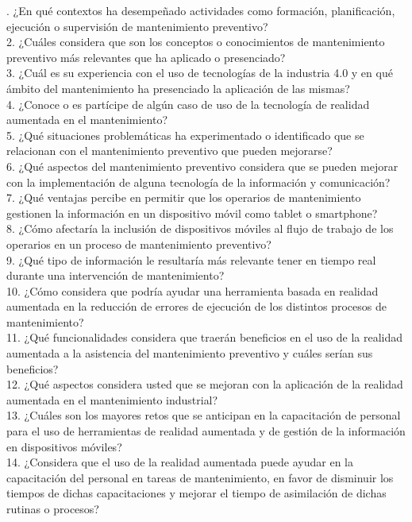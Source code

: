 {. ¿En qué contextos ha desempeñado actividades como formación, planificación, ejecución o supervisión de mantenimiento preventivo?\\

    2. ¿Cuáles considera que son los conceptos o conocimientos de mantenimiento preventivo más relevantes que ha aplicado o presenciado?\\

    3. ¿Cuál es su experiencia con el uso de tecnologías de la industria 4.0 y en qué ámbito del mantenimiento ha presenciado la aplicación de las mismas?\\

    4. ¿Conoce o es partícipe de algún caso de uso de la tecnología de realidad aumentada en el mantenimiento?\\

    5. ¿Qué situaciones problemáticas ha experimentado o identificado que se relacionan con el mantenimiento preventivo que pueden mejorarse?\\

    6. ¿Qué aspectos del mantenimiento preventivo considera que se pueden mejorar con la implementación de alguna tecnología de la información y comunicación?\\

    7. ¿Qué ventajas percibe en permitir que los operarios de mantenimiento gestionen la información en un dispositivo móvil como tablet o smartphone?\\

    8. ¿Cómo afectaría la inclusión de dispositivos móviles al flujo de trabajo de los operarios en un proceso de mantenimiento preventivo?\\

    9. ¿Qué tipo de información le resultaría más relevante tener en tiempo real durante una intervención de mantenimiento?\\

    10. ¿Cómo considera que podría ayudar una herramienta basada en realidad aumentada en la reducción de errores de ejecución de los distintos procesos de mantenimiento?\\

    11. ¿Qué funcionalidades considera que traerán beneficios en el uso de la realidad aumentada a la asistencia del mantenimiento preventivo y cuáles serían sus beneficios?\\

    12. ¿Qué aspectos considera usted que se mejoran con la aplicación de la realidad aumentada en el mantenimiento industrial?\\

    13. ¿Cuáles son los mayores retos que se anticipan en la capacitación de personal para el uso de herramientas de realidad aumentada y de gestión de la información en dispositivos móviles?\\

    14. ¿Considera que el uso de la realidad aumentada puede ayudar en la capacitación del personal en tareas de mantenimiento, en favor de disminuir los tiempos de dichas capacitaciones y mejorar el tiempo de asimilación de dichas rutinas o procesos?\\
}
